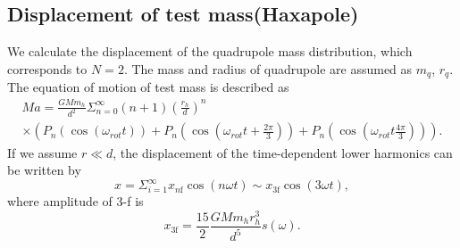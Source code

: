 \documentclass[12pt]{iopart}
\begin{document}
\subsection{Displacement of test mass(Haxapole)} \label{Quad}
We calculate the displacement of the quadrupole mass distribution, which corresponds to $N=2$.
The mass and radius of quadrupole are assumed as $m_q$, $r_q$. 
The equation of motion of test mass is described as
\begin{eqnarray}
Ma = \frac{GMm_h}{d^2}\Sigma^{\infty}_{n=0}(n+1) \left( \frac{r_h}{d} \right)^n \\
\times \left( P_n\left(\cos{\left(\omega_{rot} t \right)}\right) + P_n\left(\cos{\left(\omega_{rot} t+\frac{2\pi}{3} \right)} \right) + P_n\left(\cos{\left(\omega_{rot} t \frac{4\pi}{3} \right) }\right) \right).
\end{eqnarray} 
If we assume $r \ll d$, the displacement of the time-dependent lower harmonics can be written by 
\begin{equation}
x=\Sigma_{i=1}^{\infty}x_{n\mathrm{f}}\cos(n\omega t)\sim  x_{3\mathrm{f}}\cos(3\omega t),
\end{equation}
where amplitude of 3-f is
\begin{equation}
 x_{3\mathrm{f}}=\frac{15}{2}\frac{GMm_{h}r_{h}^3}{d^5}s(\omega). \label{3f}
\end{equation}
\end{document}

